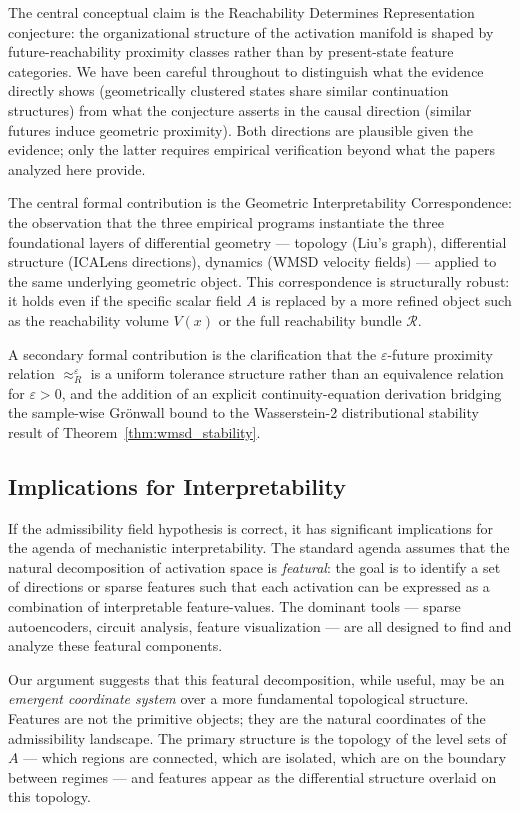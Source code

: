 \documentclass[12pt, a4paper]{article}
\theoremstyle{plain}
\theoremstyle{definition}
\theoremstyle{remark}
\newcommand{\fA}{A}
\begin{document}
The central conceptual claim is the Reachability Determines Representation
conjecture: the organizational structure of the activation manifold is shaped by
future-reachability proximity classes rather than by present-state feature
categories. We have been careful throughout to distinguish what the evidence
directly shows (geometrically clustered states share similar continuation
structures) from what the conjecture asserts in the causal direction (similar
futures induce geometric proximity). Both directions are plausible given the
evidence; only the latter requires empirical verification beyond what the papers
analyzed here provide.

The central formal contribution is the Geometric Interpretability
Correspondence: the observation that the three empirical programs instantiate
the three foundational layers of differential geometry --- topology
(Liu's graph), differential structure (ICALens directions), dynamics (WMSD
velocity fields) --- applied to the same underlying geometric object. This
correspondence is structurally robust: it holds even if the specific scalar
field $\fA$ is replaced by a more refined object such as the reachability
volume $V(x)$ or the full reachability bundle $\mathcal{R}$.

A secondary formal contribution is the clarification that the $\varepsilon$-future
proximity relation $\approx_R^\varepsilon$ is a uniform tolerance structure
rather than an equivalence relation for $\varepsilon > 0$, and the addition of
an explicit continuity-equation derivation bridging the sample-wise Gr\"{o}nwall
bound to the Wasserstein-2 distributional stability result of
Theorem~\ref{thm:wmsd_stability}.

\subsection{Implications for Interpretability}

If the admissibility field hypothesis is correct, it has significant
implications for the agenda of mechanistic interpretability. The standard
agenda assumes that the natural decomposition of activation space is
\emph{featural}: the goal is to identify a set of directions or sparse
features such that each activation can be expressed as a combination of
interpretable feature-values. The dominant tools --- sparse autoencoders,
circuit analysis, feature visualization --- are all designed to find and
analyze these featural components.

Our argument suggests that this featural decomposition, while useful, may be
an \emph{emergent coordinate system} over a more fundamental topological
structure. Features are not the primitive objects; they are the natural
coordinates of the admissibility landscape. The primary structure is the
topology of the level sets of $\fA$ --- which regions are connected, which
are isolated, which are on the boundary between regimes --- and features
appear as the differential structure overlaid on this topology.
\end{document}
